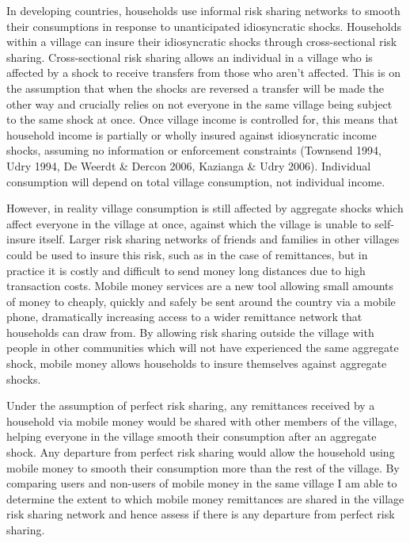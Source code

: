 In developing countries, households use informal risk sharing networks to smooth their consumptions in response to unanticipated idiosyncratic shocks. Households within a village can insure their idiosyncratic shocks through  cross-sectional risk sharing. Cross-sectional risk sharing allows an individual in a village who is affected by a shock to receive transfers from those who aren't affected. This is on the assumption that when the shocks are reversed a transfer will be made the other way and crucially relies on not everyone in the same village being subject to the same shock at once. Once village income is controlled for, this means that household income is partially or wholly insured against idiosyncratic income shocks, assuming no information or enforcement constraints (Townsend 1994, Udry 1994, De Weerdt \& Dercon 2006, Kazianga \& Udry 2006). Individual consumption will depend on total village consumption, not individual income. 

However, in reality village consumption is still affected by aggregate shocks which affect everyone in the village at once, against which the village is unable to self-insure itself. Larger risk sharing networks of friends and families in other villages could be used to insure this risk, such as in the case of remittances, but in practice it is costly and difficult to send money long distances due to high transaction costs. Mobile money services are a new tool allowing small amounts of money to cheaply, quickly and safely be sent around the country via a mobile phone, dramatically increasing access to a wider remittance network that households can draw from. By allowing risk sharing outside the village with people in other communities which will not have experienced the same aggregate shock, mobile money allows households to insure themselves against aggregate shocks.   

Under the assumption of perfect risk sharing, any remittances received by a household via mobile money would be shared with other members of the village, helping everyone in the village smooth their consumption after an aggregate shock. Any departure from perfect risk sharing would allow the household using mobile money to smooth their consumption more than the rest of the village. By comparing users and non-users of mobile money in the same village I am able to determine the extent to which mobile money remittances are shared in the village risk sharing network and hence assess if there is any departure from perfect risk sharing.    

